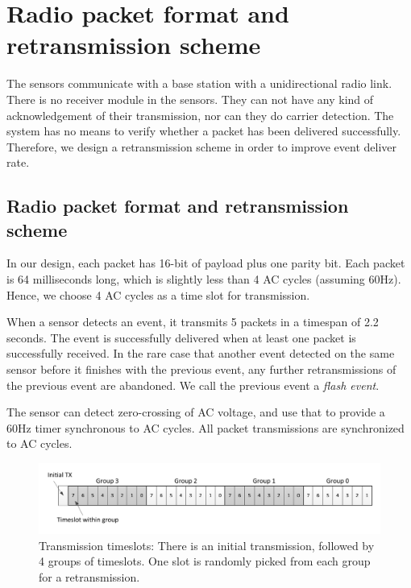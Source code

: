 \chapter{Radio packet format and retransmission scheme}\label{chap4}

The sensors communicate with a base station with a unidirectional radio link. There is no receiver module in the sensors. They can not have any kind of acknowledgement of their transmission, nor can they do carrier detection. The system has no means to verify whether a packet has been delivered successfully. Therefore, we design a retransmission scheme in order to improve event deliver rate. 

\section{Radio packet format and retransmission scheme}

In our design, each packet has 16-bit of payload plus one parity bit. Each packet is 64 milliseconds long, which is slightly less than 4 AC cycles (assuming 60Hz). Hence, we choose 4 AC cycles as a time slot for transmission. 

When a sensor detects an event, it transmits 5 packets in a timespan of 2.2 seconds. The event is successfully delivered when at least one packet is successfully received. In the rare case that another event detected on the same sensor before it finishes with the previous event, any further retransmissions of the previous event are abandoned. We call the previous event a \textit{flash event}. 

The sensor can detect zero-crossing of AC voltage, and use that to provide a 60Hz timer synchronous to AC cycles. All packet transmissions are synchronized to AC cycles. 

\begin{figure}[htb]
  \centering
  \includegraphics[width=\textwidth]{figures/slots}
  \caption[Transmission timeslots]{Transmission timeslots: There is an initial transmission, followed by 4 groups of timeslots. One slot is randomly picked from each group for a retransmission. }
  \label{fig:slots}
\end{figure}

